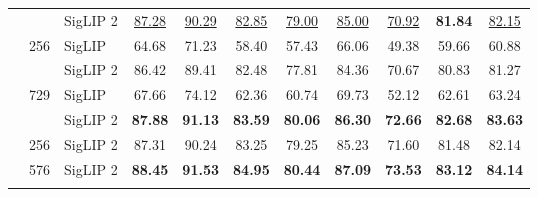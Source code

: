 \begin{tabular}{lclcccccccc}
 &  & \cellcolor{gray!15}SigLIP 2 & \cellcolor{gray!15}\underline{87.28} & \cellcolor{gray!15}\underline{90.29} & \cellcolor{gray!15}\underline{82.85} & \cellcolor{gray!15}\underline{79.00} & \cellcolor{gray!15}\underline{85.00} & \cellcolor{gray!15}\underline{70.92} & \cellcolor{gray!15}\bf{81.84} & \cellcolor{gray!15}\underline{82.15} \\
\arrayrulecolor{black}\hhline{|-----------|} 
\multirow[c]{4}{*}{So} & \multirow[c]{2}{*}{256} & SigLIP \cite{siglip} & 64.68 & 71.23 & 58.40 & 57.43 & 66.06 & 49.38 & 59.66 & 60.88 \\
 &  & \cellcolor{gray!15}SigLIP 2 & \cellcolor{gray!15}86.42 & \cellcolor{gray!15}89.41 & \cellcolor{gray!15}82.48 & \cellcolor{gray!15}77.81 & \cellcolor{gray!15}84.36 & \cellcolor{gray!15}70.67 & \cellcolor{gray!15}80.83 & \cellcolor{gray!15}81.27 \\
\arrayrulecolor{lightgray}\hhline{|~|----------|}
 & \multirow[c]{2}{*}{729} & SigLIP \cite{siglip} & 67.66 & 74.12 & 62.36 & 60.74 & 69.73 & 52.12 & 62.61 & 63.24 \\
 &  & \cellcolor{gray!15}SigLIP 2 & \cellcolor{gray!15}\bf{87.88} & \cellcolor{gray!15}\bf{91.13} & \cellcolor{gray!15}\bf{83.59} & \cellcolor{gray!15}\bf{80.06} & \cellcolor{gray!15}\bf{86.30} & \cellcolor{gray!15}\bf{72.66} & \cellcolor{gray!15}\bf{82.68} & \cellcolor{gray!15}\bf{83.63} \\
\arrayrulecolor{black}\hhline{|-----------|} 
\multirow[c]{2}{*}{g} & 256 & \cellcolor{gray!15}SigLIP 2 & \cellcolor{gray!15}87.31 & \cellcolor{gray!15}90.24 & \cellcolor{gray!15}83.25 & \cellcolor{gray!15}79.25 & \cellcolor{gray!15}85.23 & \cellcolor{gray!15}71.60 & \cellcolor{gray!15}81.48 & \cellcolor{gray!15}82.14 \\
\arrayrulecolor{lightgray}\hhline{|~|----------|}
 & 576 & \cellcolor{gray!15}SigLIP 2 & \cellcolor{gray!15}\bf{88.45} & \cellcolor{gray!15}\bf{91.53} & \cellcolor{gray!15}\bf{84.95} & \cellcolor{gray!15}\bf{80.44} & \cellcolor{gray!15}\bf{87.09} & \cellcolor{gray!15}\bf{73.53} & \cellcolor{gray!15}\bf{83.12} & \cellcolor{gray!15}\bf{84.14} \\
\arrayrulecolor{black} 
\bottomrule
\end{tabular}
